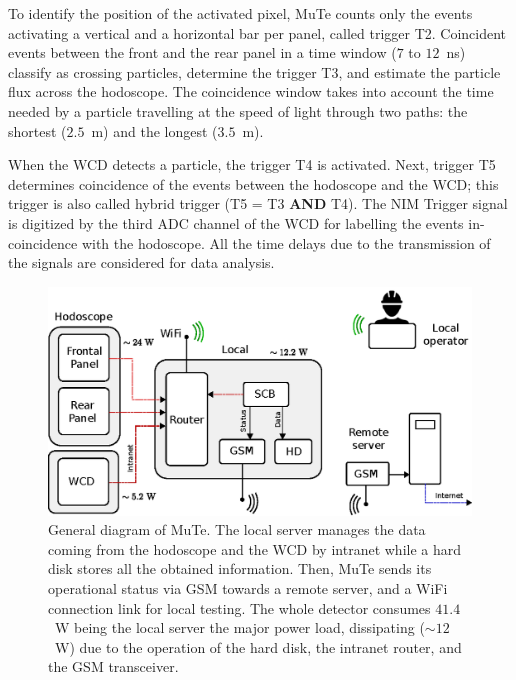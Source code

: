 \documentclass[letterpaper,11pt]{article}
\begin{document}
To identify the position of the activated pixel, MuTe counts only the events activating a vertical and a horizontal bar per panel, called trigger T2. Coincident events between the front and the rear panel in a time window ($7$ to $12$~ns) classify as crossing particles, determine the trigger T3, and estimate the particle flux across the hodoscope. The coincidence window takes into account the time needed by a particle travelling at the speed of light through two paths: the shortest ($2.5$~m) and the longest ($3.5$~m).

When the WCD detects a particle, the trigger T4 is activated. Next, trigger T5 determines coincidence of the events between the hodoscope and the WCD; this trigger is also called hybrid trigger (T5 = T3 \textbf{AND} T4). The NIM Trigger signal is digitized by the third ADC channel of the WCD for labelling the events in-coincidence with the hodoscope. All the time delays due to the transmission of the signals are considered for data analysis.

\begin{figure}
\centering
\includegraphics[width=0.8\columnwidth]{Figures/Total2.eps}
\caption{General diagram of MuTe. The local server manages the data coming from the hodoscope and the WCD by intranet while a hard disk stores all the obtained information. Then, MuTe sends its operational status via GSM towards a remote server, and a WiFi connection link for local testing. The whole detector consumes $41.4$~W being the local server the major power load, dissipating ($\sim 12$~W) due to the operation of the hard disk, the intranet router, and the GSM transceiver.}
\label{fig:power}
\end{figure}
\end{document}
